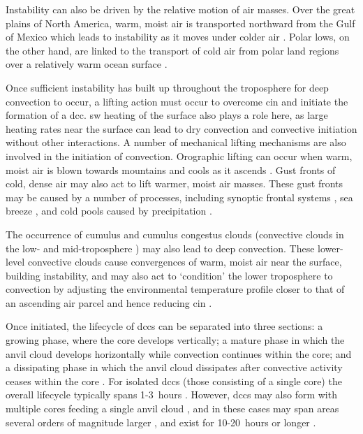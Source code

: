 Instability can also be driven by the relative motion of air masses. 
Over the great plains of North America, warm, moist air is transported northward from the Gulf of Mexico which leads to instability as it moves under colder air \citep{walters_airflow_2001}. 
Polar lows, on the other hand, are linked to the transport of cold air from polar land regions over a relatively warm ocean surface \citep{moreno-ibanez_recent_2021}.

Once sufficient instability has built up throughout the troposphere for deep convection to occur, a lifting action must occur to overcome \acrshort{cin} and initiate the formation of a \acrshort{dcc}. 
\acrshort{sw} heating of the surface also plays a role here, as large heating rates near the surface can lead to dry convection and convective initiation without other interactions. 
A number of mechanical lifting mechanisms are also involved in the initiation of convection. Orographic lifting can occur when warm, moist air is blown towards mountains and cools as it ascends \citep{hodges_distribution_1997}. 
Gust fronts of cold, dense air may also act to lift warmer, moist air masses. 
These gust fronts may be caused by a number of processes, including synoptic frontal systems \citep{wilson_initiation_1986, jirak_observational_2007}, sea breeze \citep{tripoli_numerical_1979, park_environmental_2020}, and cold pools caused by precipitation \citep{grant_cold_2016}.

The occurrence of cumulus and cumulus congestus clouds (convective clouds in the low- and mid-troposphere \citep{johnson_trimodal_1999}) may also lead to deep convection. 
These lower-level convective clouds cause convergences of warm, moist air near the surface, building instability, and may also act to `condition’ the lower troposphere to convection by adjusting the environmental temperature profile closer to that of an ascending air parcel and hence reducing \acrshort{cin} \citep{masunaga_mechanism_2014, schulz_observing_2018}.

Once initiated, the lifecycle of \acrshort{dcc}s can be separated into three sections: a growing phase, where the core develops vertically; a mature phase in which the anvil cloud develops horizontally while convection continues within the core; and a dissipating phase in which the anvil cloud dissipates after convective activity ceases within the core \citep{wall_life_2018}.
For isolated \acrshort{dcc}s (those consisting of a single core) the overall lifecycle typically spans 1-3~hours \citep{chen_diurnal_1997}.
However, \acrshort{dcc}s may also form with multiple cores feeding a single anvil cloud \citep{roca_simple_2017}, and in these cases may span areas several orders of magnitude larger \citep{houze_mesoscale_2004}, and exist for 10-20~hours or longer \citep{chen_diurnal_1997}.

